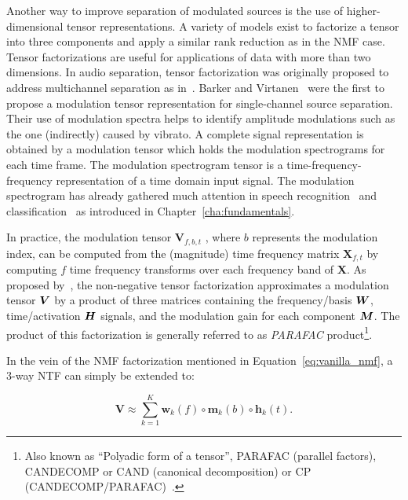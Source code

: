 
Another way to improve separation of modulated sources is the use of higher-dimensional tensor representations.
A variety of models exist to factorize a tensor into three components and apply a similar rank reduction as in the NMF case.
Tensor factorizations are useful for applications of data with more than two dimensions.
In audio separation, tensor factorization was originally proposed to address multichannel separation as in~\cite{fitzgerald08, fevotte10, ozerov11}. 
Barker and Virtanen~\cite{barker13} were the first to propose a modulation tensor representation for single-channel source separation. 
Their use of modulation spectra helps to identify amplitude modulations such as the one (indirectly) caused by vibrato. 
A complete signal representation is obtained by a modulation tensor which holds the modulation spectrograms for each time frame.
The modulation spectrogram tensor is a time-frequency-frequency representation of a time domain input signal.
The modulation spectrogram has already gathered much attention in speech recognition~\cite{greenberg97, kingsbury98} and classification~\cite{kinnunen08, markaki09} as introduced in Chapter~\ref{cha:fundamentals}.
\par
In practice, the modulation tensor \(\mathbf{V}_{f, b, t}\) , where \(b\) represents the modulation index, can be computed from the (magnitude) time frequency matrix \(\mathbf{X}_{f, t}\) by computing \(f\) time frequency transforms over each frequency band of \(\mathbf{X}\).
As proposed by~\cite{barker13}, the non-negative tensor factorization approximates a modulation tensor \({\bm{V}}\) by a product of three matrices containing the frequency/basis \({\bm{W}}\), time/activation \({\bm{H}}\) signals, and the modulation gain for each component \({\bm{M}}\).
The product of this factorization is generally referred to as \emph{PARAFAC} product\footnote{Also known as ``Polyadic form of a tensor'', PARAFAC (parallel factors), CANDECOMP or CAND (canonical decomposition) or CP (CANDECOMP/PARAFAC)~\cite{kolda09}.}.

In the vein of the NMF factorization mentioned in Equation~\ref{eq:vanilla_nmf}, a 3-way NTF can simply be extended to:

\begin{equation}
   \mathbf{V} \approx \sum\limits_{k=1}^{K} \mathbf{w}_{k}(f) \circ \mathbf{m}_{k}(b) \circ \mathbf{h}_{k}(t).
\end{equation}

